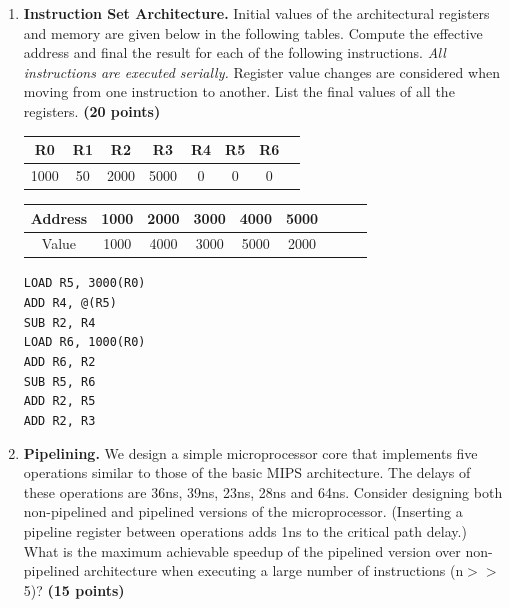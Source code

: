 \documentclass[a4paper, 15pt]{exam}
\begin{document}
\begin{enumerate}
\begin{enumerate}
	\end{enumerate}

 \item \textbf{Instruction Set Architecture.} Initial values of the architectural registers and memory are given below in the following tables. Compute the effective address and final the result for each of the following instructions. \textit{All instructions are executed serially.} Register value changes are considered when moving from one instruction to another. List the final values of all the registers. \textbf{(20 points)}
 
 \begin{center}
 	\begin{tabular}{ |c|c|c|c|c|c|c|c|} 
 		\hline
 		R0 & R1 & R2& R3 & R4 &R5&R6\\ 
 		\hline
 		1000 & 50 & 2000 & 5000 &0 & 0 & 0\\ 
 		\hline
 	\end{tabular}
 \end{center}
 
 \begin{center}
 	\begin{tabular}{ |c|c|c|c|c|c|c|c|c|} 
 		\hline
 		
 		Address&1000 & 2000 & 3000& 4000 & 5000 \\ 
 		\hline
 		Value&1000 & 4000 & 3000 & 5000 & 2000 \\ 
 		\hline
 	\end{tabular}
 \end{center}
 
 \verb|LOAD R5, 3000(R0)|
\\ \verb|ADD R4, @(R5)|
\\ \verb|SUB R2, R4|
\\ \verb|LOAD R6, 1000(R0)|
\\ \verb|ADD R6, R2|
\\ \verb|SUB R5, R6|
\\ \verb|ADD R2, R5|
\\ \verb|ADD R2, R3|



\item \textbf{Pipelining.} We design a simple microprocessor core that implements five operations similar to those of the basic MIPS architecture. The delays of these operations are 36ns, 39ns, 23ns, 28ns and 64ns. Consider designing both non-pipelined and pipelined versions of the microprocessor. (Inserting a pipeline register between operations adds 1ns to the critical path delay.) What is the maximum achievable speedup of the pipelined version over non-pipelined architecture when executing a large number of instructions (n$>>$5)? \textbf{(15 points)} \\


\end{enumerate}
\end{document}
